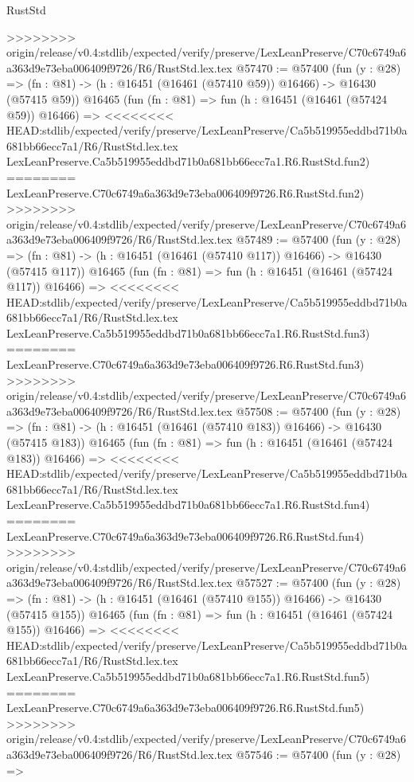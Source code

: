 \begin{lexlean}{RustStd}
\begin{coremodule}
{\begin{coremodule}
{{{{{{{{{{{{{{{{{{{{{{{{{{{{{{{{{{{{{{{{{{{{{{{{{{{{{{{>>>>>>>> origin/release/v0.4:stdlib/expected/verify/preserve/LexLeanPreserve/C70c6749a6a363d9e73eba006409f9726/R6/RustStd.lex.tex
@57470 := @57400
    (fun (y : @28) =>
    (fn : @81) -> (h : @16451 (@16461 (@57410 @59)) @16466) -> @16430 (@57415 @59))
    @16465
    (fun (fn : @81) =>
    fun (h : @16451 (@16461 (@57424 @59)) @16466) =>
<<<<<<<< HEAD:stdlib/expected/verify/preserve/LexLeanPreserve/Ca5b519955eddbd71b0a681bb66ecc7a1/R6/RustStd.lex.tex
    LexLeanPreserve.Ca5b519955eddbd71b0a681bb66ecc7a1.R6.RustStd.fun2)
========
    LexLeanPreserve.C70c6749a6a363d9e73eba006409f9726.R6.RustStd.fun2)
>>>>>>>> origin/release/v0.4:stdlib/expected/verify/preserve/LexLeanPreserve/C70c6749a6a363d9e73eba006409f9726/R6/RustStd.lex.tex
@57489 := @57400
    (fun (y : @28) =>
    (fn : @81) -> (h : @16451 (@16461 (@57410 @117)) @16466) -> @16430 (@57415 @117))
    @16465
    (fun (fn : @81) =>
    fun (h : @16451 (@16461 (@57424 @117)) @16466) =>
<<<<<<<< HEAD:stdlib/expected/verify/preserve/LexLeanPreserve/Ca5b519955eddbd71b0a681bb66ecc7a1/R6/RustStd.lex.tex
    LexLeanPreserve.Ca5b519955eddbd71b0a681bb66ecc7a1.R6.RustStd.fun3)
========
    LexLeanPreserve.C70c6749a6a363d9e73eba006409f9726.R6.RustStd.fun3)
>>>>>>>> origin/release/v0.4:stdlib/expected/verify/preserve/LexLeanPreserve/C70c6749a6a363d9e73eba006409f9726/R6/RustStd.lex.tex
@57508 := @57400
    (fun (y : @28) =>
    (fn : @81) -> (h : @16451 (@16461 (@57410 @183)) @16466) -> @16430 (@57415 @183))
    @16465
    (fun (fn : @81) =>
    fun (h : @16451 (@16461 (@57424 @183)) @16466) =>
<<<<<<<< HEAD:stdlib/expected/verify/preserve/LexLeanPreserve/Ca5b519955eddbd71b0a681bb66ecc7a1/R6/RustStd.lex.tex
    LexLeanPreserve.Ca5b519955eddbd71b0a681bb66ecc7a1.R6.RustStd.fun4)
========
    LexLeanPreserve.C70c6749a6a363d9e73eba006409f9726.R6.RustStd.fun4)
>>>>>>>> origin/release/v0.4:stdlib/expected/verify/preserve/LexLeanPreserve/C70c6749a6a363d9e73eba006409f9726/R6/RustStd.lex.tex
@57527 := @57400
    (fun (y : @28) =>
    (fn : @81) -> (h : @16451 (@16461 (@57410 @155)) @16466) -> @16430 (@57415 @155))
    @16465
    (fun (fn : @81) =>
    fun (h : @16451 (@16461 (@57424 @155)) @16466) =>
<<<<<<<< HEAD:stdlib/expected/verify/preserve/LexLeanPreserve/Ca5b519955eddbd71b0a681bb66ecc7a1/R6/RustStd.lex.tex
    LexLeanPreserve.Ca5b519955eddbd71b0a681bb66ecc7a1.R6.RustStd.fun5)
========
    LexLeanPreserve.C70c6749a6a363d9e73eba006409f9726.R6.RustStd.fun5)
>>>>>>>> origin/release/v0.4:stdlib/expected/verify/preserve/LexLeanPreserve/C70c6749a6a363d9e73eba006409f9726/R6/RustStd.lex.tex
@57546 := @57400
    (fun (y : @28) =>
}}}}}}}}}}}}}}}}}}}}}}}}}}}}}}}}}}}}}}}}}}}}}}}}}}}}}}}
\end{coremodule}}
\end{coremodule}
\end{lexlean}
